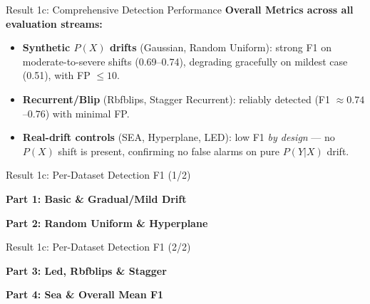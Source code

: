 \documentclass[aspectratio=169,10pt]{beamer}
\begin{document}
\begin{frame}{Result 1c: Comprehensive Detection Performance}
	\vfill
	\textbf{Overall Metrics across all evaluation streams:}
	\vspace{0.5em}
	
	\begin{table}[]
		\centering
		\resizebox{0.9\linewidth}{!}{}
	\end{table}
	
	\vfill
	\begin{itemize}
		\scriptsize
		\setlength\itemsep{0.2em}
		\item \textbf{Synthetic $P(X)$ drifts} (Gaussian, Random Uniform): strong F1 on moderate-to-severe shifts (0.69--0.74), degrading gracefully on mildest case (0.51), with FP $\leq 10$.
		\item \textbf{Recurrent/Blip} (Rbfblips, Stagger Recurrent): reliably detected (F1 $\approx 0.74$--$0.76$) with minimal FP.
		\item \textbf{Real-drift controls} (SEA, Hyperplane, LED): low F1 \emph{by design} --- no $P(X)$ shift is present, confirming no false alarms on pure $P(Y|X)$ drift.
	\end{itemize}
	\vfill
\end{frame}

\begin{frame}[shrink]{Result 1c: Per-Dataset Detection F1 (1/2)}
	\vfill
	\begin{center}
		\textbf{Part 1: Basic \& Gradual/Mild Drift}
		\vspace{0.3em}
		
		\resizebox{0.95\linewidth}{!}{}
		
		\vspace{0.8em}
		
		\textbf{Part 2: Random Uniform \& Hyperplane}
		\vspace{0.3em}
		
		\resizebox{0.95\linewidth}{!}{}
	\end{center}
	\vfill
\end{frame}

\begin{frame}[shrink]{Result 1c: Per-Dataset Detection F1 (2/2)}
	\vfill
	\begin{center}
		\textbf{Part 3: Led, Rbfblips \& Stagger}
		\vspace{0.3em}
		
		\resizebox{0.95\linewidth}{!}{}
		
		\vspace{0.8em}
		
		\textbf{Part 4: Sea \& Overall Mean F1}
		\vspace{0.3em}
		
		\resizebox{0.62\linewidth}{!}{}
	\end{center}
	\vfill
\end{frame}
\end{document}
